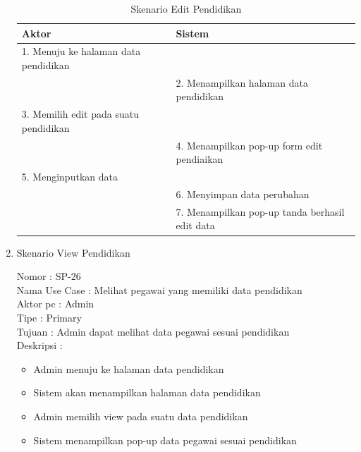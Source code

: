 \begin{enumerate}
\begin{itemize}
\end{itemize}

\begin{table}
	\caption{Skenario Edit Pendidikan}
	\centering
	\begin{tabular}{ | p{67mm} | p{61mm} |}
		\hline 
		\textbf{Aktor} & \textbf{Sistem} \\
		\hline
		
		1.	Menuju ke halaman data pendidikan &  \\
		
		\hline
		
		&  2.	Menampilkan halaman data pendidikan \\
		
		\hline
		
		3. Memilih edit pada suatu pendidikan & \\
		
		\hline
		
		& 4.	Menampilkan pop-up form edit pendiaikan \\
		
		\hline
		
		5.	Menginputkan data  & \\
		\hline
		
		& 6.	Menyimpan data perubahan \\
		\hline
		
		& 7.	Menampilkan pop-up tanda berhasil edit data \\
		\hline
		
	\end{tabular}
\end{table}

\item Skenario View Pendidikan

Nomor \kern 3.6pc : SP-26 \\
Nama Use Case : Melihat pegawai yang memiliki data pendidikan \\
Aktor  pc : Admin \\
Tipe \kern 4.6pc : Primary \\
Tujuan \kern 3.6pc : Admin dapat melihat data pegawai sesuai pendidikan \\
Deskripsi \kern 2.5pc : 

\begin{itemize}
	\item Admin menuju ke halaman data pendidikan
	\item Sistem akan menampilkan halaman data pendidikan
	\item Admin memilih view pada suatu data pendidikan
	\item Sistem menampilkan pop-up data pegawai sesuai pendidikan 
	

\end{itemize}
\end{enumerate}
